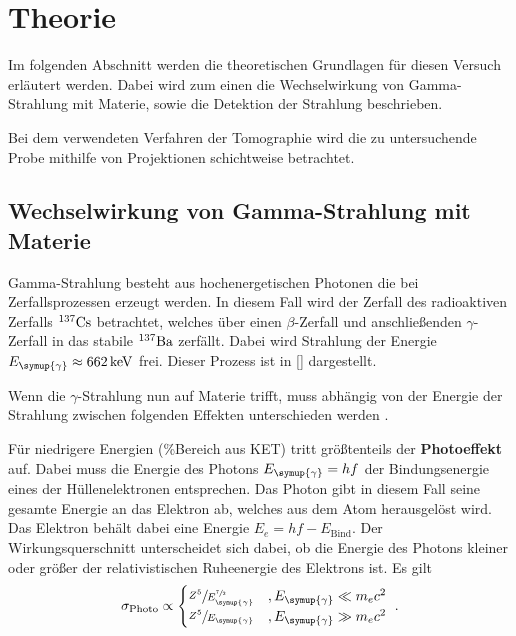 \section{Theorie}
\label{sec:theorie}

    Im folgenden Abschnitt werden die theoretischen Grundlagen für diesen Versuch erläutert werden.
    Dabei wird zum einen die Wechselwirkung von Gamma-Strahlung mit Materie,
    sowie die Detektion der Strahlung beschrieben.

    Bei dem verwendeten Verfahren der Tomographie wird die zu untersuchende Probe mithilfe von Projektionen schichtweise betrachtet.

\subsection{Wechselwirkung von Gamma-Strahlung mit Materie}

    Gamma-Strahlung besteht aus hochenergetischen Photonen die bei Zerfallsprozessen erzeugt werden.
    In diesem Fall wird der Zerfall des radioaktiven Zerfalls $^{137}\ce{Cs}$ betrachtet,
    welches über einen $\beta$-Zerfall und anschließenden $\gamma$-Zerfall in das stabile $^{137}\ce{Ba}$ zerfällt.
    Dabei wird Strahlung der Energie $E_{\symup{\gamma}} \approx \SI{662}{\kilo\eV}$ \cite{caesium} frei.
    Dieser Prozess ist in \autoref{} dargestellt.

    Wenn die $\gamma$-Strahlung nun auf Materie trifft,
    muss abhängig von der Energie der Strahlung zwischen folgenden Effekten unterschieden werden \cite{radioaktivitaet}.


    \label{sec:theorie:photoeffekt}
    Für niedrigere Energien (\%Bereich aus KET) tritt größtenteils der \textbf{Photoeffekt} auf.
    Dabei muss die Energie des Photons $E_{\symup{\gamma}} = hf$ der Bindungsenergie eines der Hüllenelektronen entsprechen.
    Das Photon gibt in diesem Fall seine gesamte Energie an das Elektron ab,
    welches aus dem Atom herausgelöst wird.
    Das Elektron behält dabei eine Energie $E_{e} = hf - E_\text{Bind}$.
    Der Wirkungsquerschnitt unterscheidet sich dabei,
    ob die Energie des Photons kleiner oder größer der relativistischen Ruheenergie des Elektrons ist.
    Es gilt
    \begin{equation*}
        \sigma_\text{Photo} \propto
        \begin{cases}
            \sfrac{Z^5}{E^{\sfrac{7}{2}}_{\symup{\gamma}}} & , E_{\symup{\gamma}} \ll m_{e} c^2 \\
            \sfrac{Z^5}{E_{\symup{\gamma}}} & , E_{\symup{\gamma}} \gg m_{e} c^2 \\
        \end{cases} \ .
    \end{equation*}


